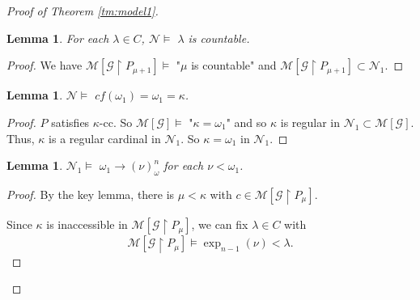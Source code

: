 \documentclass[a4paper,10pt,reqno]{amsart}
\numberwithin{equation}{section}
\newtheorem{lemma}[theorem]{Lemma}
\theoremstyle{definition}
\theoremstyle{remark}
\newcommand{\mc}[1]{\mathcal{#1}}
\newcommand{\subs}{\subset}
\newcommand{\dom}{\operatorname{dom}}
\begin{document}
\begin{proof}[Proof of Theorem \ref{tm:model1}]
\begin{lemma}
    For each ${\lambda}\in C$, $\mc N\models$ ${\lambda}$ is countable.  
    \end{lemma}
    
\begin{proof}
We  have  $\mc M[\mc G\restriction P_{\mu+1}]\models$ "${\mu}$  is countable"
and   $\mc M[\mc G\restriction P_{\mu+1}]\subs \mc N_1$.
\end{proof}


\begin{lemma}
    $\mc N\models$ $cf({\omega}_1)={\omega}_1={\kappa}$.   
   \end{lemma}
   
   \begin{proof}
       $P$ satisfies ${\kappa}$-cc.  So 
       $\mc M[\mc G]\models $ "${\kappa}={\omega}_1$" and so ${\kappa}$ is regular in $\mc N_1\subs \mc M[\mc G]$. 
Thus, ${\kappa}$ is a regular cardinal in $\mc N_1$. So ${\kappa}={\omega}_1$ in $\mc N_1$.
    \end{proof}

\newpage


\begin{lemma}
    $\mc N_1\models $ ${\omega}_1\to ({\nu})^n_{\omega}$ for each 
    ${\nu}<{\omega}_1$.
    \end{lemma}




\begin{proof}
   By the key lemma, there is ${\mu}<{\kappa}$ with $c\in \mc M[\mc G\restriction P_{\mu}]$.

    
Since ${\kappa}$ is inaccessible in  $\mc M[\mc G\restriction P_{\mu}]$, we can  
fix   ${\lambda}\in C$ with
\begin{displaymath}
    \mc M[\mc G\restriction P_{\mu}]\models
    \exp_{n-1}({\nu})<{\lambda}. 
\end{displaymath}   


\end{proof}
\end{proof}
\end{document}
